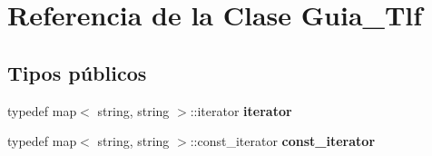 \hypertarget{classGuia__Tlf}{}\section{Referencia de la Clase Guia\+\_\+\+Tlf}
\label{classGuia__Tlf}
\subsection*{Tipos públicos}
\begin{DoxyCompactItemize}
\item 
\mbox{\label{classGuia__Tlf_aaedde471768223b8631c638d5baf0d66}} 
typedef map$<$ string, string $>$\+::iterator {\bfseries iterator}
\item 
\mbox{\label{classGuia__Tlf_a67c34df9510da513efd400c2b1bbedeb}} 
typedef map$<$ string, string $>$\+::const\+\_\+iterator {\bfseries const\+\_\+iterator}
\end{DoxyCompactItemize}
